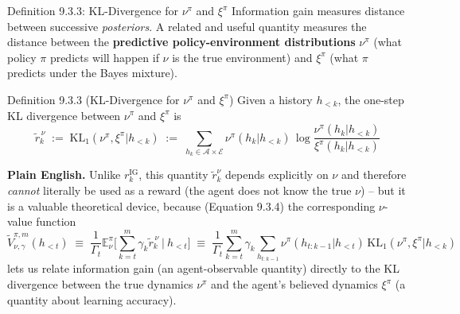 \documentclass[aspectratio=169,10pt]{beamer}
\newcommand{\E}{\mathbb{E}}
\newcommand{\IG}{\mathrm{IG}}
\begin{document}
\begin{frame}{Definition 9.3.3: KL-Divergence for $\nu^\pi$ and $\xi^\pi$}
  Information gain measures distance between successive \emph{posteriors}.
  A related and useful quantity measures the distance between the
  \textbf{predictive policy-environment distributions} $\nu^\pi$ (what
  policy $\pi$ predicts will happen if $\nu$ is the true environment) and
  $\xi^\pi$ (what $\pi$ predicts under the Bayes mixture).

  \begin{block}{Definition 9.3.3 (KL-Divergence for $\nu^\pi$ and $\xi^\pi$)}
    Given a history $h_{<k}$, the one-step KL divergence between
    $\nu^\pi$ and $\xi^\pi$ is
    \[
      \tilde r_k^{\,\nu} \;:=\; \mathrm{KL}_1(\nu^\pi,\xi^\pi|h_{<k}) \;:=\; \sum_{h_k\in\mathcal{A}\times\mathcal{E}} \nu^\pi(h_k|h_{<k})\, \log\frac{\nu^\pi(h_k|h_{<k})}{\xi^\pi(h_k|h_{<k})}
    \]
  \end{block}
  \textbf{Plain English.} Unlike $r_k^{\IG}$, this quantity $\tilde r_k^\nu$
  depends explicitly on $\nu$ and therefore \emph{cannot} literally be used
  as a reward (the agent does not know the true $\nu$) -- but it is a
  valuable theoretical device, because (Equation 9.3.4) the corresponding
  $\nu$-value function
  \[
    \tilde V^{\pi,m}_{\nu,\gamma}(h_{<t}) \;\equiv\; \frac{1}{\Gamma_t}\E^\pi_\nu\Big[\sum_{k=t}^m \gamma_k\tilde r_k^{\,\nu}\ \Big|\ h_{<t}\Big]
    \;\equiv\; \frac{1}{\Gamma_t}\sum_{k=t}^m\gamma_k\sum_{h_{t:k-1}} \nu^\pi(h_{t:k-1}|h_{<t})\,\mathrm{KL}_1(\nu^\pi,\xi^\pi|h_{<k})
  \]
  lets us relate information gain (an agent-observable quantity) directly
  to the KL divergence between the true dynamics $\nu^\pi$ and the agent's
  believed dynamics $\xi^\pi$ (a quantity about learning accuracy).
\end{frame}
\end{document}
